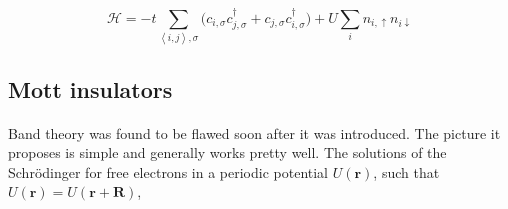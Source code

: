 \documentclass[10pt, twocolumn, twoside]{article}
\begin{document}
\begin{equation}\label{eq:hubbard_hamiltonian}
\mathcal{H} = - t \sum_{\left\langle i, j \right\rangle, \sigma} \bigg(c_{i,\sigma} c_{j,\sigma}^\dagger + c_{j,\sigma} c_{i,\sigma}^\dagger \bigg) + U \sum_{i} n_{i,\uparrow} n_{i\downarrow}
\end{equation}

\subsection{Mott insulators}\paragraph{}

Band theory was found to be flawed soon after it was introduced. The picture it proposes is simple and generally works pretty well. The solutions of the Schr\"odinger for free electrons in a periodic potential $U(\bm r)$, such that $U(\bm r) = U(\bm r + \bm R)$,
\end{document}
